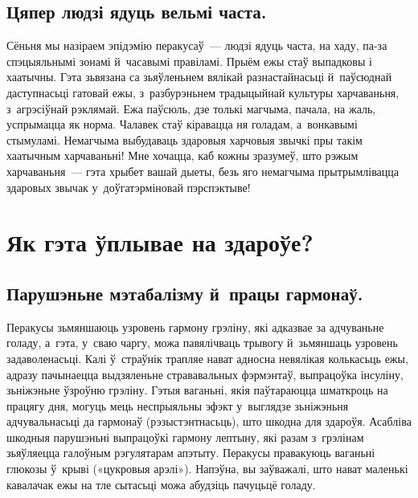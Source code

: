 
\subsection{Цяпер людзі ядуць вельмі часта.}
Сёньня мы назіраем эпідэмію перакусаў~--- людзі ядуць часта, на хаду, па-за спэцыяльнымі зонамі й~часавымі правіламі. Прыём ежы стаў выпадковы і хаатычны. Гэта зьвязана са зьяўленьнем вялікай разнастайнасьці й~паўсюднай даступнасьці гатовай ежы, з~разбурэньнем традыцыйнай культуры харчаваньня, з~агрэсіўнай рэклямай. Ежа паўсюль, дзе толькі магчыма, пачала, на жаль, успрымацца як норма. Чалавек стаў кіравацца ня голадам, а~вонкавымі стымуламі. Немагчыма выбудаваць здаровыя харчовыя звычкі пры такім хаатычным харчаваньні! Мне хочацца, каб кожны зразумеў, што рэжым харчаваньня~--- гэта хрыбет вашай дыеты, безь яго немагчыма прытрымлівацца здаровых звычак у~доўгатэрміновай пэрспэктыве!

\section{Як гэта ўплывае на здароўе?}

\subsection{Парушэньне мэтабалізму й~працы гармонаў.}
Перакусы зьмяншаюць узровень гармону грэліну, які адказвае за адчуваньне голаду, а~гэта, у~сваю чаргу, можа павялічваць трывогу й~зьмяншаць узровень задаволенасьці. Калі ў~страўнік трапляе нават адносна невялікая колькасьць ежы, адразу пачынаецца выдзяленьне стрававальных фэрмэнтаў, выпрацоўка інсуліну, зьніжэньне ўзроўню грэліну. Гэтыя ваганьні, якія паўтараюцца шматкроць на працягу дня, могуць мець неспрыяльны эфэкт у~выглядзе зьніжэньня адчувальнасьці да гармонаў (рэзыстэнтнасьць), што шкодна для здароўя. Асабліва шкодныя парушэньні выпрацоўкі гармону лептыну, які разам з~грэлінам зьяўляецца галоўным рэгулятарам апэтыту. Перакусы правакуюць ваганьні глюкозы ў~крыві («цукровыя арэлі»). Напэўна, вы заўважалі, што нават маленькі кавалачак ежы на тле сытасьці можа абудзіць пачуцьцё голаду.

